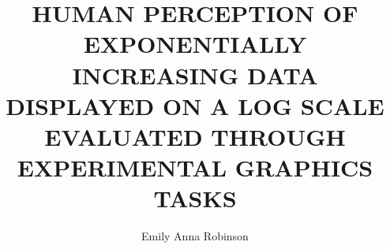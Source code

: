 \documentclass[print]{nuthesis}
\begin{document}
\frontmatter
\title{HUMAN PERCEPTION OF EXPONENTIALLY INCREASING DATA DISPLAYED ON A LOG SCALE EVALUATED THROUGH EXPERIMENTAL GRAPHICS TASKS}
\author{Emily Anna Robinson}
\adviserAbstract{}
\maketitle
\end{document}
